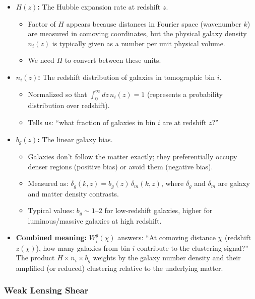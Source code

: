 \begin{itemize}[leftmargin=1.5cm]
    \item \textbf{$H(z)$:} The Hubble expansion rate at redshift $z$.
    \begin{itemize}
        \item Factor of $H$ appears because distances in Fourier space (wavenumber $k$) are measured in comoving coordinates, but the physical galaxy density $n_i(z)$ is typically given as a number per unit physical volume.
        \item We need $H$ to convert between these units.
    \end{itemize}

    \item \textbf{$n_i(z)$:} The redshift distribution of galaxies in tomographic bin $i$.
    \begin{itemize}
        \item Normalized so that $\int_0^\infty dz \, n_i(z) = 1$ (represents a probability distribution over redshift).
        \item Tells us: ``what fraction of galaxies in bin $i$ are at redshift $z$?''
    \end{itemize}

    \item \textbf{$b_g(z)$:} The linear galaxy bias.
    \begin{itemize}
        \item Galaxies don't follow the matter exactly; they preferentially occupy denser regions (positive bias) or avoid them (negative bias).
        \item Measured as: $\delta_g(k,z) = b_g(z) \, \delta_m(k,z)$, where $\delta_g$ and $\delta_m$ are galaxy and matter density contrasts.
        \item Typical values: $b_g \sim 1$--$2$ for low-redshift galaxies, higher for luminous/massive galaxies at high redshift.
    \end{itemize}

    \item \textbf{Combined meaning:} $W^g_i(\chi)$ answers: ``At comoving distance $\chi$ (redshift $z(\chi)$), how many galaxies from bin $i$ contribute to the clustering signal?'' The product $H \times n_i \times b_g$ weights by the galaxy number density and their amplified (or reduced) clustering relative to the underlying matter.
\end{itemize}

\subsubsection{Weak Lensing Shear}


